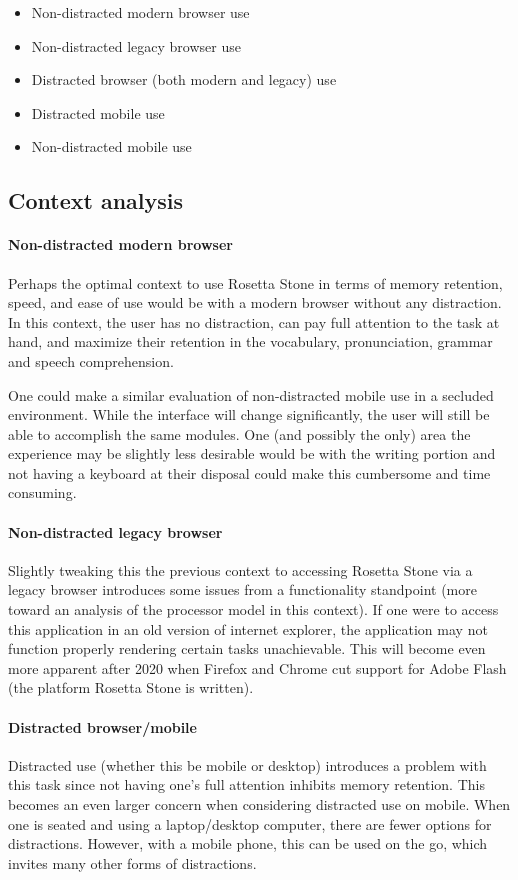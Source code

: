 \begin{itemize}
\item
  Non-distracted modern browser use
\item
  Non-distracted legacy browser use
\item
  Distracted browser (both modern and legacy) use
\item
  Distracted mobile use
\item
  Non-distracted mobile use
\end{itemize}

\subsection{Context analysis}

\paragraph{Non-distracted modern browser}
Perhaps the optimal context to use Rosetta Stone in terms of memory retention, speed, and ease of use would be with a modern browser without any distraction. In this context, the user has no distraction, can pay full attention to the task at hand, and maximize their retention in the vocabulary, pronunciation, grammar and speech comprehension.

One could make a similar evaluation of non-distracted mobile use in a secluded environment. While the interface will change significantly, the user will still be able to accomplish the same modules. One (and possibly the only) area the experience may be slightly less desirable would be with the writing portion and not having a keyboard at their disposal could make this cumbersome and time consuming.

\paragraph{Non-distracted legacy browser}
Slightly tweaking this the previous context to accessing Rosetta Stone via a legacy browser introduces some issues from a functionality standpoint (more toward an analysis of the processor model in this context). If one were to access this application in an old version of internet explorer, the application may not function properly rendering certain tasks unachievable. This will become even more apparent after 2020 when Firefox and Chrome cut support for Adobe Flash (the platform Rosetta Stone is written).

\paragraph{Distracted browser/mobile}
Distracted use (whether this be mobile or desktop) introduces a problem with this task since not having one's full attention inhibits memory retention. This becomes an even larger concern when considering distracted use on mobile. When one is seated and using a laptop/desktop computer, there are fewer options for distractions. However, with a mobile phone, this can be used on the go, which invites many other forms of distractions.


